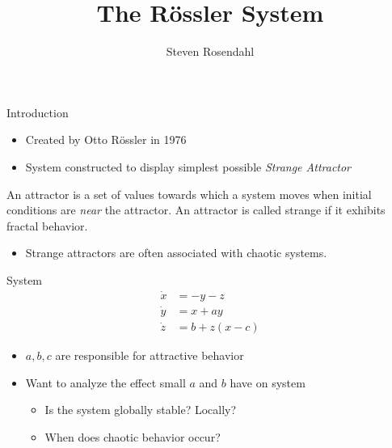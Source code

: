 \documentclass{beamer}
\title{The R\"{o}ssler System}
\author{Steven Rosendahl}
\date{}
\begin{document}
\begin{frame}
	\titlepage
\end{frame}

\begin{frame}{Introduction}
	\begin{itemize}
		\item Created by Otto R\"{o}ssler in 1976
		      \pause
		\item System constructed to display simplest possible \textit{Strange Attractor}
		      \pause
	\end{itemize}
	\begin{definition}
		An \alert{attractor} is a set of values towards which a system moves when initial conditions are \textit{near} the attractor.
		\pause
		An attractor is called \alert{strange} if it exhibits fractal behavior.
	\end{definition}
	\pause
	\begin{itemize}
		\item Strange attractors are often associated with chaotic systems.
	\end{itemize}
\end{frame}

\begin{frame}{System}
	\begin{align*}
		\dot{x} & = -y-z     \\
		\dot{y} & = x+ay     \\
		\dot{z} & = b+z(x-c)
	\end{align*}
	\pause
	\begin{itemize}
		\item $a,b,c$ are responsible for attractive behavior
		      \pause
		\item Want to analyze the effect small $a$ and $b$ have on system
		      \pause
		      \begin{itemize}
		      	\item Is the system globally stable? Locally?
		      	      \pause
		      	\item When does chaotic behavior occur?
		      \end{itemize}
	\end{itemize}
\end{frame}
\end{document}
